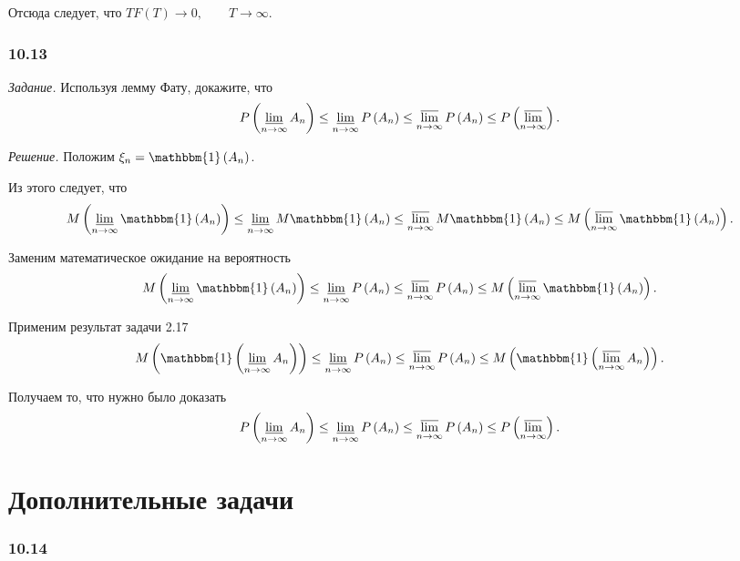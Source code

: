 Отсюда следует, что $TF \left( T \right) \rightarrow 0, \qquad T \rightarrow \infty $.

\subsubsection*{10.13}

\textit{Задание.} Используя лемму Фату, докажите, что
$$P \left( \varliminf \limits_{n \to \infty } A_n \right) \leq
\varliminf \limits_{n \to \infty } P \left( A_n \right) \leq
\varlimsup \limits_{n \to \infty } P \left( A_n \right) \leq
P \left( \varlimsup \limits_{n \to \infty } \right).$$

\textit{Решение.} Положим $ \xi_n = \mathbbm{1} \left( A_n \right) $.

Из этого следует, что
$$M \left( \varliminf \limits_{n \to \infty } \mathbbm{1} \left( A_n \right) \right) \leq
\varliminf \limits_{n \to \infty } M \mathbbm{1} \left( A_n \right) \leq
\varlimsup \limits_{n \to \infty } M \mathbbm{1} \left( A_n \right) \leq
M \left( \varlimsup \limits_{n \to \infty } \mathbbm{1} \left( A_n \right) \right).$$

Заменим математическое ожидание на вероятность
$$M \left( \varliminf \limits_{n \to \infty } \mathbbm{1} \left( A_n \right) \right) \leq
\varliminf \limits_{n \to \infty } P \left( A_n \right) \leq
\varlimsup \limits_{n \to \infty } P \left( A_n \right) \leq
M \left( \varlimsup \limits_{n \to \infty } \mathbbm{1} \left( A_n \right) \right).$$

Применим результат задачи 2.17
$$M \left( \mathbbm{1} \left( \varliminf \limits_{n \to \infty } A_n \right) \right) \leq
\varliminf \limits_{n \to \infty } P \left( A_n \right) \leq
\varlimsup \limits_{n \to \infty } P \left( A_n \right) \leq
M \left( \mathbbm{1} \left( \varlimsup \limits_{n \to \infty } A_n \right) \right).$$

Получаем то, что нужно было доказать
$$P \left( \varliminf \limits_{n \to \infty } A_n \right) \leq
\varliminf \limits_{n \to \infty } P \left( A_n \right) \leq
\varlimsup \limits_{n \to \infty } P \left( A_n \right) \leq
P \left( \varlimsup \limits_{n \to \infty } \right).$$

\section*{Дополнительные задачи}

\subsubsection*{10.14}

